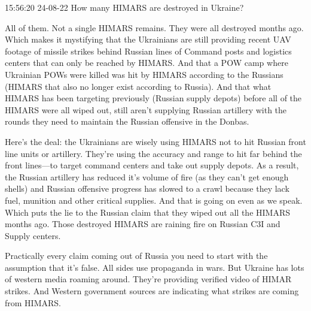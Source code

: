  
 
 
 
 

15:56:20 24-08-22
How many HIMARS are destroyed in Ukraine?


All of them. Not a single HIMARS remains. They were all destroyed months ago. Which makes it mystifying that the Ukrainians are still providing recent UAV footage of missile strikes behind Russian lines of Command posts and logistics centers that can only be reached by HIMARS. And that a POW camp where Ukrainian POWs were killed was hit by HIMARS according to the Russians (HIMARS that also no longer exist according to Russia). And that what HIMARS has been targeting previously (Russian supply depots) before all of the HIMARS were all wiped out, still aren’t supplying Russian artillery with the rounds they need to maintain the Russian offensive in the Donbas.

Here’s the deal: the Ukrainians are wisely using HIMARS not to hit Russian front line units or artillery. They’re using the accuracy and range to hit far behind the front lines—to target command centers and take out supply depots. As a result, the Russian artillery has reduced it’s volume of fire (as they can’t get enough shells) and Russian offensive progress has slowed to a crawl because they lack fuel, munition and other critical supplies. And that is going on even as we speak. Which puts the lie to the Russian claim that they wiped out all the HIMARS months ago. Those destroyed HIMARS are raining fire on Russian C3I and Supply centers.

Practically every claim coming out of Russia you need to start with the assumption that it’s false. All sides use propaganda in wars. But Ukraine has lots of western media roaming around. They’re providing verified video of HIMAR strikes. And Western government sources are indicating what strikes are coming from HIMARS.
